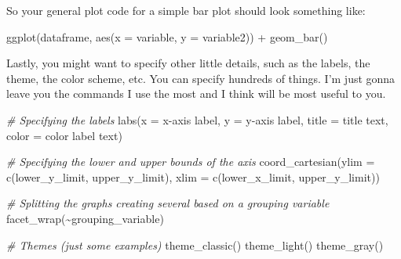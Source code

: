\documentclass[
]{book}
\newenvironment{Shaded}{\begin{snugshade}}{\end{snugshade}}
\newcommand{\AttributeTok}[1]{\textcolor[rgb]{0.77,0.63,0.00}{#1}}
\newcommand{\CommentTok}[1]{\textcolor[rgb]{0.56,0.35,0.01}{\textit{#1}}}
\newcommand{\FunctionTok}[1]{\textcolor[rgb]{0.00,0.00,0.00}{#1}}
\newcommand{\NormalTok}[1]{#1}
\newcommand{\SpecialCharTok}[1]{\textcolor[rgb]{0.00,0.00,0.00}{#1}}
\newcommand{\StringTok}[1]{\textcolor[rgb]{0.31,0.60,0.02}{#1}}
\begin{document}
So your general plot code for a simple bar plot should look something like:

\begin{Shaded}
\begin{Highlighting}[]
\FunctionTok{ggplot}\NormalTok{(dataframe, }\FunctionTok{aes}\NormalTok{(}\AttributeTok{x =}\NormalTok{ variable, }\AttributeTok{y =}\NormalTok{ variable2)) }\SpecialCharTok{+}
  \FunctionTok{geom\_bar}\NormalTok{() }
\end{Highlighting}
\end{Shaded}

Lastly, you might want to specify other little details, such as the labels, the theme, the color scheme, etc.
You can specify hundreds of things.
I'm just gonna leave you the commands I use the most and I think will be most useful to you.

\begin{Shaded}
\begin{Highlighting}[]
\CommentTok{\# Specifying the labels}
\FunctionTok{labs}\NormalTok{(}\AttributeTok{x =} \StringTok{\textquotesingle{}x{-}axis label\textquotesingle{}}\NormalTok{, }\AttributeTok{y =} \StringTok{\textquotesingle{}y{-}axis label\textquotesingle{}}\NormalTok{, }\AttributeTok{title =} \StringTok{\textquotesingle{}title text\textquotesingle{}}\NormalTok{, }\AttributeTok{color =} \StringTok{\textquotesingle{}color label text\textquotesingle{}}\NormalTok{)}

\CommentTok{\# Specifying the lower and upper bounds of the axis}
\FunctionTok{coord\_cartesian}\NormalTok{(}\AttributeTok{ylim =} \FunctionTok{c}\NormalTok{(}\StringTok{\textquotesingle{}lower\_y\_limit\textquotesingle{}}\NormalTok{, }\StringTok{\textquotesingle{}upper\_y\_limit\textquotesingle{}}\NormalTok{),}
                \AttributeTok{xlim =} \FunctionTok{c}\NormalTok{(}\StringTok{\textquotesingle{}lower\_x\_limit\textquotesingle{}}\NormalTok{, }\StringTok{\textquotesingle{}upper\_y\_limit\textquotesingle{}}\NormalTok{))}

\CommentTok{\# Splitting the graphs creating several based on a grouping variable}
\FunctionTok{facet\_wrap}\NormalTok{(}\SpecialCharTok{\textasciitilde{}}\StringTok{\textquotesingle{}grouping\_variable\textquotesingle{}}\NormalTok{)}

\CommentTok{\# Themes (just some examples)}
\FunctionTok{theme\_classic}\NormalTok{()}
\FunctionTok{theme\_light}\NormalTok{()}
\FunctionTok{theme\_gray}\NormalTok{()}
\end{Highlighting}
\end{Shaded}
\end{document}
